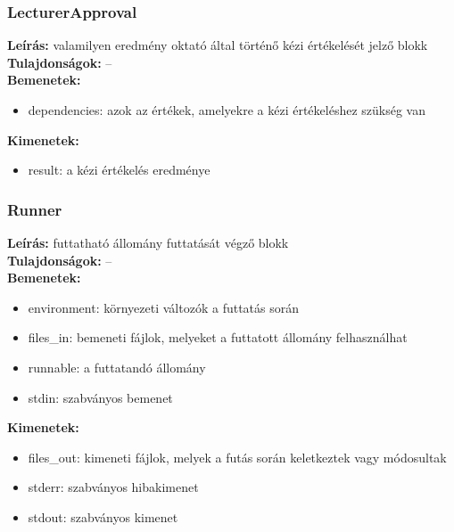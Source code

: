 \subsubsection{LecturerApproval}
\textbf{Leírás:} valamilyen eredmény oktató által történő kézi értékelését jelző blokk \\
\textbf{Tulajdonságok:} -- \\
\textbf{Bemenetek:}
\begin{itemize}
    \item dependencies: azok az értékek, amelyekre a kézi értékeléshez szükség van
\end{itemize}
\textbf{Kimenetek:}
\begin{itemize}
    \item result: a kézi értékelés eredménye
\end{itemize}

\subsubsection{Runner}
\textbf{Leírás:} futtatható állomány futtatását végző blokk \\
\textbf{Tulajdonságok:} -- \\
\textbf{Bemenetek:}
\begin{itemize}
    \item environment: környezeti változók a futtatás során
    \item files\_in: bemeneti fájlok, melyeket a futtatott állomány felhasználhat
    \item runnable: a futtatandó állomány
    \item stdin: szabványos bemenet
\end{itemize}
\textbf{Kimenetek:}
\begin{itemize}
    \item files\_out: kimeneti fájlok, melyek a futás során keletkeztek vagy módosultak
    \item stderr: szabványos hibakimenet
    \item stdout: szabványos kimenet
\end{itemize}

